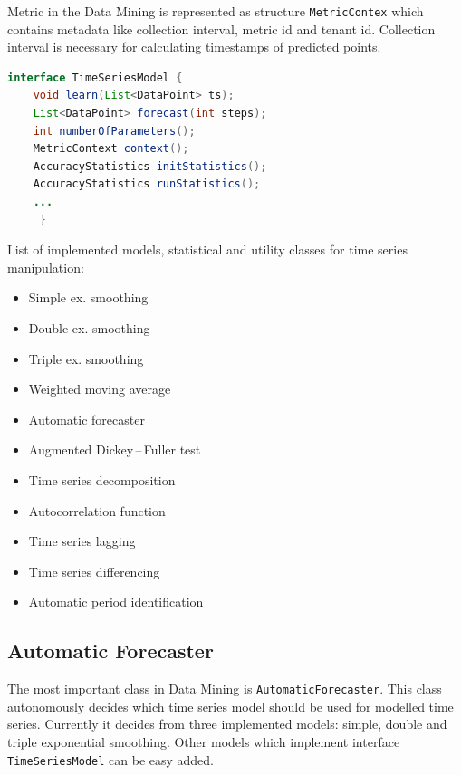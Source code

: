     Metric in the Data Mining is represented as structure \texttt{MetricContex} which contains metadata like
    collection interval, metric id and tenant id. Collection interval is necessary for calculating timestamps of
    predicted points.

    \begin{lstlisting}[caption={Interface for time series models.}, language=Java, label={alg:models}]
interface TimeSeriesModel {
    void learn(List<DataPoint> ts);
    List<DataPoint> forecast(int steps);
    int numberOfParameters();
    MetricContext context();
    AccuracyStatistics initStatistics();
    AccuracyStatistics runStatistics();
    ...
     }
    \end{lstlisting}

    List of implemented models, statistical and utility classes for time series manipulation:

    \begin{multicols}{2}
    \begin{itemize}
        \item Simple ex. smoothing
        \item Double ex. smoothing
        \item Triple ex. smoothing
        \item Weighted moving average
        \item Automatic forecaster
        \item Augmented Dickey\,--\,Fuller test
        \item Time series decomposition
        \item Autocorrelation function
        \item Time series lagging
        \item Time series differencing
        \item Automatic period identification
    \end{itemize}
    \end{multicols}

        \subsection{Automatic Forecaster}
        The most important class in Data Mining is \texttt{AutomaticForecaster}. This class autonomously
        decides which time series model should be used for modelled time series. Currently it decides from
        three implemented models: simple, double and triple exponential smoothing. Other models which implement
        interface \texttt{TimeSeriesModel} can be easy added.

